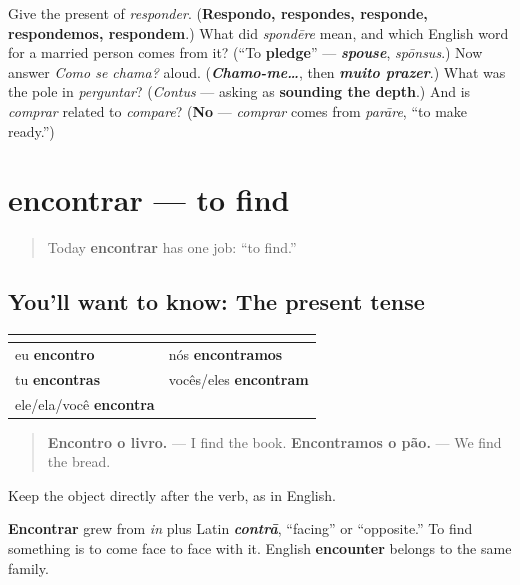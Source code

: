 \begin{tcolorbox}[breakable,colback=teal!4,colframe=teal!35!black,title={Before you move on}]
Give the present of \emph{responder}. (\textbf{Respondo, respondes, responde, respondemos, respondem}.) What did \emph{spondēre} mean, and which English word for a married person comes from it? (\textquotedblleft{}To \textbf{pledge}\textquotedblright{} — \emph{\textbf{spouse}}, \emph{spōnsus}.) Now answer \emph{Como se chama?} aloud. (\emph{\textbf{Chamo-me…}}, then \emph{\textbf{muito prazer}}.) What was the pole in \emph{perguntar}? (\emph{Contus} — asking as \textbf{sounding the depth}.) And is \emph{comprar} related to \emph{compare}? (\textbf{No} — \emph{comprar} comes from \emph{parāre}, \textquotedblleft{}to make ready.\textquotedblright{})
\end{tcolorbox}
\section[encontrar]{encontrar — to find}

\label{lesson:PT-C22-encontrar}



\begin{quote}
Today \textbf{encontrar} has one job: “to find.”
\end{quote}

\subsection*{You'll want to know: The present tense}
\noindent
\begin{tabularx}{\linewidth}{@{}>{\raggedright\arraybackslash}X>{\raggedright\arraybackslash}X@{}}
\toprule
\textbf{} & \textbf{} \\
\midrule
eu \textbf{encontro} & nós \textbf{encontramos} \\
tu \textbf{encontras} & vocês/eles \textbf{encontram} \\
ele/ela/você \textbf{encontra} &  \\
\bottomrule
\end{tabularx}

\begin{quote}
\textbf{Encontro o livro.} — I find the book. \textbf{Encontramos o pão.} — We find the bread.
\end{quote}

Keep the object directly after the verb, as in English.

\begin{cousinweb}
\textbf{Encontrar} grew from \emph{in} plus Latin \emph{\textbf{contrā}}, “facing” or “opposite.” To find something is to come face to face with it. English \textbf{encounter} belongs to the same family.
\end{cousinweb}

